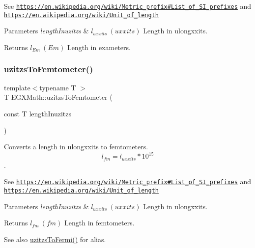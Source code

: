 See \href{https://en.wikipedia.org/wiki/Metric_prefix#List_of_SI_prefixes}{\tt https\+://en.\+wikipedia.\+org/wiki/\+Metric\+\_\+prefix\#\+List\+\_\+of\+\_\+\+S\+I\+\_\+prefixes} and \href{https://en.wikipedia.org/wiki/Unit_of_length}{\tt https\+://en.\+wikipedia.\+org/wiki/\+Unit\+\_\+of\+\_\+length} 
\begin{DoxyParams}{Parameters}
{\em length\+Inuzitzs} & $ l_{uxxits}\ (uxxits)$ Length in ulongxxits. \\
\hline
\end{DoxyParams}
\begin{DoxyReturn}{Returns}
$ l_{Em}\ (Em)$ Length in exameters. 
\end{DoxyReturn}
\mbox{\label{group___e_g_x_math-_conversions-_length_conversions-_non-_s_i-uzitzs-_s_i_ga55b363df9781c5d92c86bcef272dfc7f}} 
\subsubsection{\texorpdfstring{uzitzs\+To\+Femtometer()}{uzitzsToFemtometer()}}
{\footnotesize\ttfamily template$<$typename T $>$ \\
T E\+G\+X\+Math\+::uzitzs\+To\+Femtometer (\begin{DoxyParamCaption}\item[{const T}]{length\+Inuzitzs }\end{DoxyParamCaption})}



Converts a length in ulongxxits to femtometers. \[ l_{fm}=l_{uxxits} * 10^{15} \]. 

See \href{https://en.wikipedia.org/wiki/Metric_prefix#List_of_SI_prefixes}{\tt https\+://en.\+wikipedia.\+org/wiki/\+Metric\+\_\+prefix\#\+List\+\_\+of\+\_\+\+S\+I\+\_\+prefixes} and \href{https://en.wikipedia.org/wiki/Unit_of_length}{\tt https\+://en.\+wikipedia.\+org/wiki/\+Unit\+\_\+of\+\_\+length} 
\begin{DoxyParams}{Parameters}
{\em length\+Inuzitzs} & $ l_{uxxits}\ (uxxits)$ Length in ulongxxits. \\
\hline
\end{DoxyParams}
\begin{DoxyReturn}{Returns}
$ l_{fm}\ (fm)$ Length in femtometers. 
\end{DoxyReturn}
\begin{DoxySeeAlso}{See also}
\mbox{\hyperlink{group___e_g_x_math-_conversions-_length_conversions-_non-_s_i-uzitzs-_non-_s_i_ga920cd8aae6bc9f70faa49a6a5c988040}{uzitzs\+To\+Fermi()}} for alias. 
\end{DoxySeeAlso}
\mbox{\label{group___e_g_x_math-_conversions-_length_conversions-_non-_s_i-uzitzs-_s_i_ga15833fbe62cb7d741b808bc63a21df55}} 
